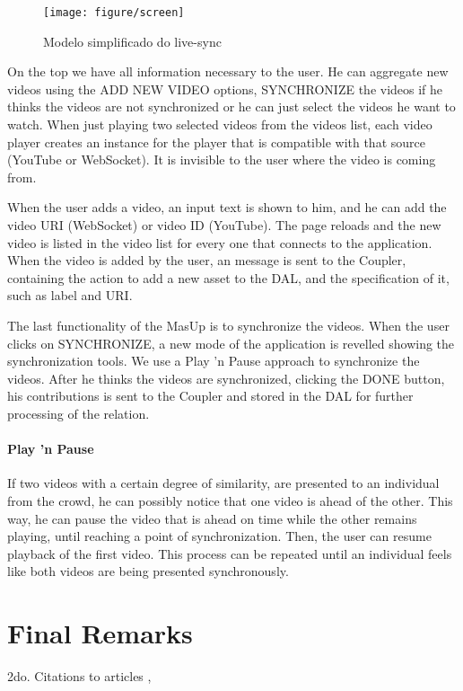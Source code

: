 \documentclass{sig-alternate-05-2015}
\begin{document}
\begin{figure}[h]
	\centerline{\texttt{[image: figure/screen]}}
	\caption{Modelo simplificado do live-sync}
	\label{screen1}
\end{figure}

On the top we have all information necessary to the user. He can aggregate new videos using the ADD NEW VIDEO options, SYNCHRONIZE the videos if he thinks the videos are not synchronized or he can just select the videos he want to watch. When just playing two selected videos from the videos list, each video player creates an instance for the player that is compatible with that source (YouTube or WebSocket). It is invisible to the user where the video is coming from.

When the user adds a video, an input text is shown to him, and he can add the video URI (WebSocket) or video ID (YouTube). The page reloads and the new video is listed in the video list for every one that connects to the application. When the video is added by the user, an message is sent to the Coupler, containing the action to add a new asset to the DAL, and the specification of it, such as label and URI.

The last functionality of the MasUp is to synchronize the videos. When the user clicks on SYNCHRONIZE, a new mode of the application is revelled showing the synchronization tools. We use a Play 'n Pause approach to synchronize the videos. After he thinks the videos are synchronized, clicking the DONE button, his contributions is sent to the Coupler and stored in the DAL for further processing of the relation.

\paragraph{Play 'n Pause}
If two videos with a certain degree of similarity, are presented to an individual from the crowd, he can possibly notice that one video is ahead of the other. This way, he can pause the video that is ahead on time while the other remains playing, until reaching a point of synchronization. Then, the user can resume playback of the first video. This process can be repeated until an individual feels like both videos are being presented synchronously.

\section{Final Remarks}
2do.
Citations to articles \cite{bowman:reasoning,
clark:pct, braams:babel, herlihy:methodology},
\end{document}
